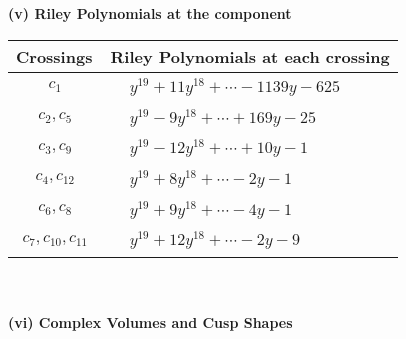 \documentclass[1p]{elsarticle_modified}
\theoremstyle{definition}
\begin{document}
\newpage\renewcommand{\arraystretch}{1}
\flushleft \textbf{(v) Riley Polynomials at the component}\newline \\
\begin{tabular}{m{50pt}|m{274pt}}
Crossings & \hspace{64pt}Riley Polynomials at each crossing \\
\hline $$\begin{aligned}c_{1}\end{aligned}$$&$\begin{aligned}
&y^{19}+11 y^{18}+\cdots-1139 y-625
\end{aligned}$\\
\hline $$\begin{aligned}c_{2},c_{5}\end{aligned}$$&$\begin{aligned}
&y^{19}-9 y^{18}+\cdots+169 y-25
\end{aligned}$\\
\hline $$\begin{aligned}c_{3},c_{9}\end{aligned}$$&$\begin{aligned}
&y^{19}-12 y^{18}+\cdots+10 y-1
\end{aligned}$\\
\hline $$\begin{aligned}c_{4},c_{12}\end{aligned}$$&$\begin{aligned}
&y^{19}+8 y^{18}+\cdots-2 y-1
\end{aligned}$\\
\hline $$\begin{aligned}c_{6},c_{8}\end{aligned}$$&$\begin{aligned}
&y^{19}+9 y^{18}+\cdots-4 y-1
\end{aligned}$\\
\hline $$\begin{aligned}c_{7},c_{10},c_{11}\end{aligned}$$&$\begin{aligned}
&y^{19}+12 y^{18}+\cdots-2 y-9
\end{aligned}$\\
\hline
\end{tabular}\\~\\
\newpage\flushleft \textbf{(vi) Complex Volumes and Cusp Shapes}
\end{document}
